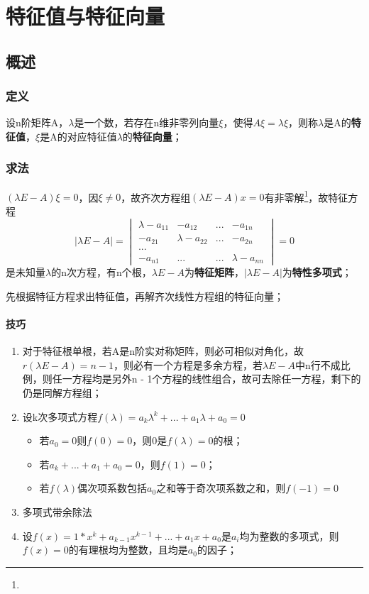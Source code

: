 
\chapter{特征值与特征向量}

\section{概述}

\subsection{定义}
设n阶矩阵A，\(\lambda\)是一个数，若存在n维非零列向量\(\xi\)，使得\(A\xi = \lambda\xi\)，则称\(\lambda\)是A的\textbf{特征值}，\(\xi\)是A的对应特征值\(\lambda\)的\textbf{特征向量}；

\subsection{求法}
\((\lambda E - A)\xi = 0\)，因\(\xi \neq 0\)，故齐次方程组\((\lambda E - A)x = 0\)有非零解\footnote[1]{\mymatrix}，故特征方程\[|\lambda E - A| = \begin{vmatrix}
\lambda - a_{11} & -a_{12} & ... & -a_{1n} \\ 
-a_{21} & \lambda - a_{22} & ... & -a_{2n} \\
... \\ 
-a_{n1} & ... & ... & \lambda - a_{nn}
\end{vmatrix} = 0\]是未知量\(\lambda\)的n次方程，有n个根，\(\lambda E - A\)为\textbf{特征矩阵}，\(|\lambda E - A|\)为\textbf{特性多项式}；

先根据特征方程求出特征值，再解齐次线性方程组的特征向量；

\subsubsection{技巧}
\begin{enumerate}
    \item 对于特征根单根，若A是n阶实对称矩阵，则必可相似对角化，故\(r(\lambda E - A) = n - 1\)，则必有一个方程是多余方程，若\(\lambda E - A\)中n行不成比例，则任一方程均是另外n - 1个方程的线性组合，故可去除任一方程，剩下的仍是同解方程组；
    \item 设k次多项式方程\(f(\lambda) = a_k\lambda^k + ... + a_1\lambda + a_0 = 0\)\begin{itemize}
        \item 若\(a_0 = 0\)则\(f(0) = 0\)，则0是\(f(\lambda) = 0\)的根；
        \item 若\(a_k + ... + a_1 + a_0 = 0\)，则\(f(1) = 0\)；
        \item 若\(f(\lambda)\)偶次项系数包括\(a_0\)之和等于奇次项系数之和，则\(f(-1) = 0\)
    \end{itemize}
    \item 多项式带余除法
    \item 设\(f(x) = 1 * x^k + a_{k - 1}x^{k - 1} + ... + a_1x + a_0\)是\(a_i\)均为整数的多项式，则\(f(x) = 0\)的有理根均为整数，且均是\(a_0\)的因子；
\end{enumerate}


